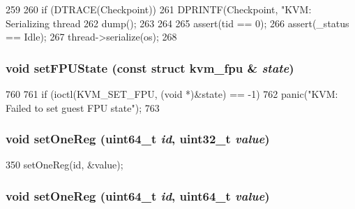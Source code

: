 \begin{DoxyCode}
259 {
260     if (DTRACE(Checkpoint)) {
261         DPRINTF(Checkpoint, "KVM: Serializing thread %
262         dump();
263     }
264 
265     assert(tid == 0);
266     assert(_status == Idle);
267     thread->serialize(os);
268 }
\end{DoxyCode}
\hypertarget{classBaseKvmCPU_a31b5d1e73edb46a17fa0a8ddd29e7604}{
\subsubsection[{setFPUState}]{\setlength{\rightskip}{0pt plus 5cm}void setFPUState (const struct kvm\_\-fpu \& {\em state})}}
\label{classBaseKvmCPU_a31b5d1e73edb46a17fa0a8ddd29e7604}



\begin{DoxyCode}
760 {
761     if (ioctl(KVM_SET_FPU, (void *)&state) == -1)
762         panic("KVM: Failed to set guest FPU state\n");
763 }
\end{DoxyCode}
\hypertarget{classBaseKvmCPU_ab70d563942fa831d4de5da7d94ba8064}{
\subsubsection[{setOneReg}]{\setlength{\rightskip}{0pt plus 5cm}void setOneReg (uint64\_\-t {\em id}, \/  {\bf uint32\_\-t} {\em value})}}
\label{classBaseKvmCPU_ab70d563942fa831d4de5da7d94ba8064}



\begin{DoxyCode}
350 { setOneReg(id, &value); }
\end{DoxyCode}
\hypertarget{classBaseKvmCPU_a0f8ff23affd5f22fc47c4d00e6d24979}{
\subsubsection[{setOneReg}]{\setlength{\rightskip}{0pt plus 5cm}void setOneReg (uint64\_\-t {\em id}, \/  uint64\_\-t {\em value})}}
\label{classBaseKvmCPU_a0f8ff23affd5f22fc47c4d00e6d24979}



